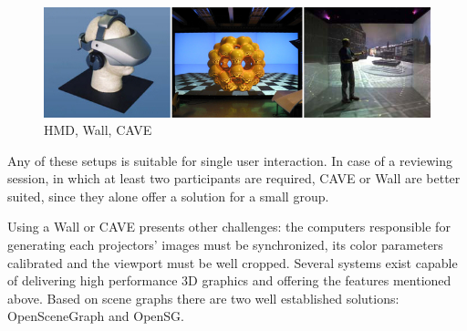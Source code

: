 \begin{figure}[!ht]
	\centering
	\includegraphics[width=12cm]{gfx/hmd-cluster-cave.png}
	\caption{HMD, Wall, CAVE}
	\label{FIG-HMD-CLUSTER-CAVE}
\end{figure}

Any of these setups is suitable for single user interaction.
In case of a reviewing session, in which at least two participants are required,
CAVE or Wall are better suited, since they alone offer a solution for a small group.

Using a Wall or CAVE presents other challenges: the computers responsible for
generating each projectors' images must be synchronized, its color parameters calibrated
and the viewport must be well cropped.
Several systems exist capable of delivering high performance 3D graphics and
offering the features mentioned above.
Based on scene graphs there are two well established solutions:
OpenSceneGraph\cite{SITE-OSG} and OpenSG\cite{SITE-OPENSG}.
